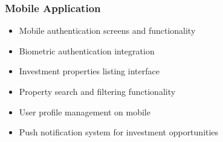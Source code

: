 \subsubsection{Mobile Application}
\begin{itemize}
    \item Mobile authentication screens and functionality
    \item Biometric authentication integration
    \item Investment properties listing interface
    \item Property search and filtering functionality
    \item User profile management on mobile
    \item Push notification system for investment opportunities
\end{itemize}

